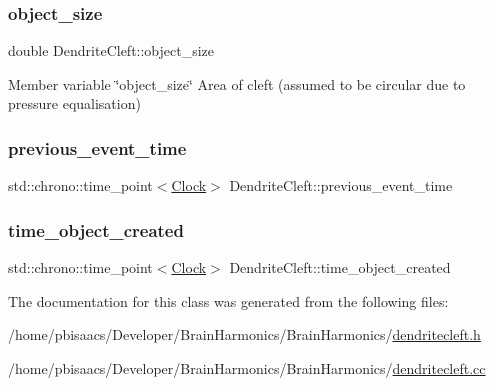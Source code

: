\mbox{\label{classDendriteCleft_ac78e2502c53c1b3d0c2a759f3b653dde}} 
\subsubsection{\texorpdfstring{object\+\_\+size}{object\_size}}
{\footnotesize\ttfamily double Dendrite\+Cleft\+::object\+\_\+size\hspace{0.3cm}{\ttfamily [private]}}



Member variable \char`\"{}object\+\_\+size\char`\"{} Area of cleft (assumed to be circular due to pressure equalisation) 

\mbox{\label{classDendriteCleft_a97d85edbb69960d16398d212107c36fb}} 
\subsubsection{\texorpdfstring{previous\+\_\+event\+\_\+time}{previous\_event\_time}}
{\footnotesize\ttfamily std\+::chrono\+::time\+\_\+point$<$\mbox{\hyperlink{universe_8h_a0ef8d951d1ca5ab3cfaf7ab4c7a6fd80}{Clock}}$>$ Dendrite\+Cleft\+::previous\+\_\+event\+\_\+time\hspace{0.3cm}{\ttfamily [private]}}

\mbox{\label{classDendriteCleft_a145dcc0e5e2564e22464625930c006c9}} 
\subsubsection{\texorpdfstring{time\+\_\+object\+\_\+created}{time\_object\_created}}
{\footnotesize\ttfamily std\+::chrono\+::time\+\_\+point$<$\mbox{\hyperlink{universe_8h_a0ef8d951d1ca5ab3cfaf7ab4c7a6fd80}{Clock}}$>$ Dendrite\+Cleft\+::time\+\_\+object\+\_\+created\hspace{0.3cm}{\ttfamily [private]}}



The documentation for this class was generated from the following files\+:\begin{DoxyCompactItemize}
\item 
/home/pbisaacs/\+Developer/\+Brain\+Harmonics/\+Brain\+Harmonics/\mbox{\hyperlink{dendritecleft_8h}{dendritecleft.\+h}}\item 
/home/pbisaacs/\+Developer/\+Brain\+Harmonics/\+Brain\+Harmonics/\mbox{\hyperlink{dendritecleft_8cc}{dendritecleft.\+cc}}\end{DoxyCompactItemize}
